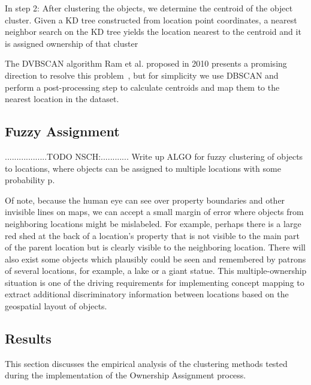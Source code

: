 In step 2: After clustering the objects, we determine the centroid of the object cluster. Given a KD tree constructed from location point coordinates, a nearest neighbor search on the KD tree yields the location nearest to the centroid and it is assigned ownership of that cluster

The DVBSCAN algorithm Ram et al. proposed in 2010 presents a promising direction to resolve this problem~\cite{Ram2010}, but for simplicity we use DBSCAN and perform a post-processing step to calculate centroids and map them to the nearest location in the dataset. 

\subsection{Fuzzy Assignment} \label{subsection:fuzzy_asn}
..................TODO NSCH:............ Write up ALGO for fuzzy clustering of objects to locations, where objects can be assigned to multiple locations with some probability p.

Of note, because the human eye can see over property boundaries and other invisible lines on maps, we can accept a small margin of error where objects from neighboring locations might be mislabeled. For example, perhaps there is a large red shed at the back of a location's property that is not visible to the main part of the parent location but is clearly visible to the neighboring location.
There will also exist some objects which plausibly could be seen and remembered by patrons of several locations, for example, a lake or a giant statue. 
This multiple-ownership situation is one of the driving requirements for implementing concept mapping to extract additional discriminatory information between locations based on the geospatial layout of objects.


\subsection{Results}
This section discusses the empirical analysis of the clustering methods tested during the implementation of the Ownership Assignment process. 

